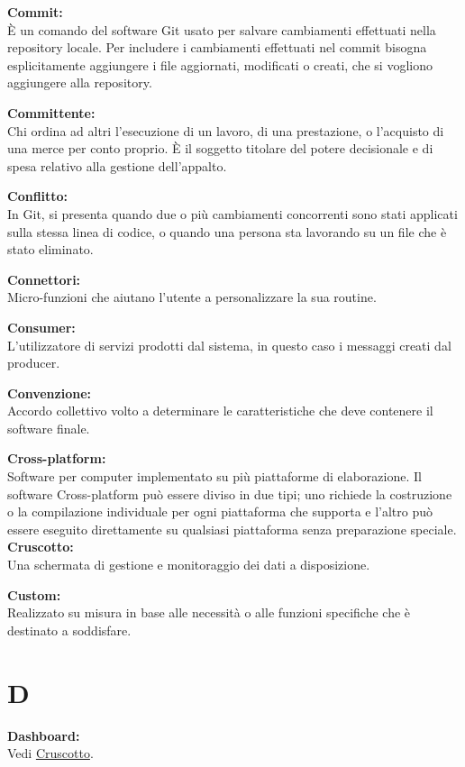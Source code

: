 \documentclass[a4paper, oneside, openany, dvipsnames, table]{article}
\begin{document}
\textbf{Commit:}\\ \`E un comando del software Git usato per salvare cambiamenti effettuati nella repository locale. Per includere i cambiamenti effettuati nel commit bisogna esplicitamente aggiungere i file aggiornati, modificati o creati, che si vogliono aggiungere alla repository.


\textbf{Committente:}\\	Chi ordina ad altri l’esecuzione di un lavoro, di una prestazione, o l’acquisto di una merce per conto proprio. \`E il soggetto titolare del potere decisionale e di spesa relativo alla gestione dell'appalto.

\textbf{Conflitto:}\\	In Git, si presenta quando due o più cambiamenti concorrenti sono stati applicati sulla stessa linea di codice, o quando una persona sta lavorando su un file che è stato eliminato.

\textbf{Connettori:}\\ Micro-funzioni che aiutano l'utente a personalizzare la sua routine.

\textbf{Consumer:}\\ L'utilizzatore di servizi prodotti dal sistema, in questo caso i messaggi creati dal producer.

\textbf{Convenzione:}\\	Accordo collettivo volto a determinare le caratteristiche che deve contenere il software finale.

\textbf{Cross-platform:}\\	 Software per computer implementato su più piattaforme di elaborazione. Il software Cross-platform può essere diviso in due tipi; uno richiede la costruzione o la compilazione individuale per ogni piattaforma che supporta e l'altro può essere eseguito direttamente su qualsiasi piattaforma senza preparazione speciale.
\label{crts:Cruscotto}
\textbf{Cruscotto:}\\	Una schermata di gestione e monitoraggio dei dati a disposizione.

\textbf{Custom:}\\	Realizzato su misura in base alle necessità o alle funzioni specifiche che è destinato a soddisfare.	


\newpage

\section{D}
\textbf{Dashboard:}	\\  Vedi \hyperref[crts:Cruscotto]{Cruscotto}.
\end{document}
